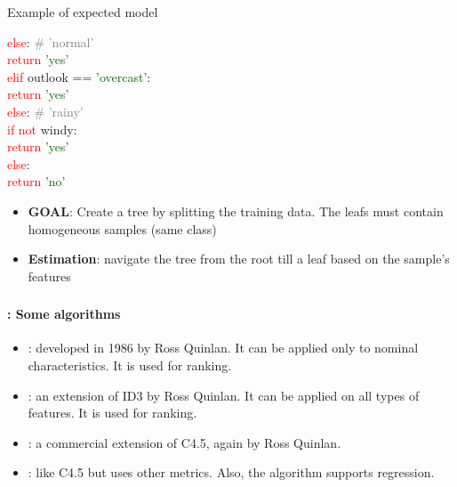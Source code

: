 \documentclass[xcolor=table]{beamer}
\begin{document}
\begin{frame}
\begin{exampleblock}{Example of expected model}
\begin{minipage}{0.25\textwidth}
			\hspace*{10pt}\textcolor{red}{else}: \textcolor{gray}{\# 'normal'}\\
			\hspace*{20pt}\textcolor{red}{return} '\textcolor{darkgreen}{yes}'\\
			\textcolor{red}{elif}  outlook == '\textcolor{darkgreen}{overcast}':\\
			\hspace*{10pt}\textcolor{red}{return} '\textcolor{darkgreen}{yes}'\\
			\textcolor{red}{else}: \textcolor{gray}{\# 'rainy'}\\
			\hspace*{10pt}\textcolor{red}{if not} windy:\\
			\hspace*{20pt}\textcolor{red}{return} '\textcolor{darkgreen}{yes}'\\
			\hspace*{10pt}\textcolor{red}{else}:\\
			\hspace*{20pt}\textcolor{red}{return} '\textcolor{darkgreen}{no}' 
		\end{minipage}
		\begin{minipage}{0.38\textwidth} 
		\end{minipage}
	\end{exampleblock}
	
	\vspace{-6pt}
	\begin{itemize}
		\item \textbf{GOAL}: Create a tree by splitting the training data. The leafs must contain homogeneous samples (same class)
		\item \textbf{Estimation}: navigate the tree from the root till a leaf based on the sample's features
	\end{itemize}
	
\end{frame}

\begin{frame}
	\frametitle{\insertshortsubtitle}
	\framesubtitle{\insertsection: Some algorithms}
	
	\begin{itemize}
		\item {}: developed in 1986 by Ross Quinlan. It can be applied only to nominal characteristics. It is used for ranking.
		\item {}: an extension of ID3 by Ross Quinlan. It can be applied on all types of features. It is used for ranking.
		\item {}: a commercial extension of C4.5, again by Ross Quinlan.
		\item {}: like C4.5 but uses other metrics. Also, the algorithm supports regression.
	\end{itemize}
	
\end{frame}
\end{document}
